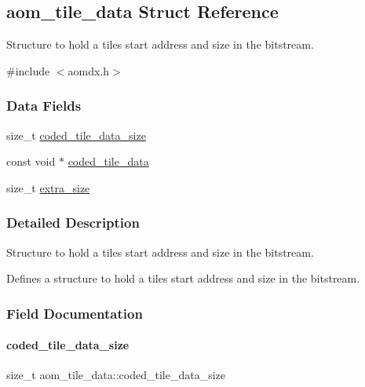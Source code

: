 \hypertarget{structaom__tile__data}{}\subsection{aom\+\_\+tile\+\_\+data Struct Reference}
\label{structaom__tile__data}


Structure to hold a tile\textquotesingle{}s start address and size in the bitstream.  




{\ttfamily \#include $<$aomdx.\+h$>$}

\subsubsection*{Data Fields}
\begin{DoxyCompactItemize}
\item 
size\+\_\+t \hyperlink{structaom__tile__data_a4451b0bcd81b4959484745df35a9fbba}{coded\+\_\+tile\+\_\+data\+\_\+size}
\item 
const void $\ast$ \hyperlink{structaom__tile__data_a05898249ddaf5ba799dd471113b0e51e}{coded\+\_\+tile\+\_\+data}
\item 
size\+\_\+t \hyperlink{structaom__tile__data_a936851e515bcea0af38d2d091f5adf65}{extra\+\_\+size}
\end{DoxyCompactItemize}


\subsubsection{Detailed Description}
Structure to hold a tile\textquotesingle{}s start address and size in the bitstream. 

Defines a structure to hold a tile\textquotesingle{}s start address and size in the bitstream. 

\subsubsection{Field Documentation}
\mbox{\label{structaom__tile__data_a4451b0bcd81b4959484745df35a9fbba}} 
\paragraph{\texorpdfstring{coded\+\_\+tile\+\_\+data\+\_\+size}{coded\_tile\_data\_size}}
{\footnotesize\ttfamily size\+\_\+t aom\+\_\+tile\+\_\+data\+::coded\+\_\+tile\+\_\+data\+\_\+size}

